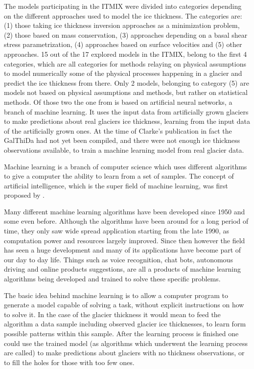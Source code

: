 The models participating in the ITMIX were divided into categories depending on the different approaches used to model the ice thickness. The categories are: (1) those taking ice thickness inversion approaches as a minimization problem, (2) those based on mass conservation,  (3) approaches depending on a basal shear stress parametrization, (4) approaches based on surface velocities and (5) other approaches. 15 out of the 17 explored models in the ITMIX, belong to the first 4 categories, which are all categories for methods relaying on physical assumptions to model numerically some of the physical processes happening in a glacier and predict the ice thickness from there. Only 2 models, belonging to category (5) are models not based on physical assumptions and methods, but rather on statistical methods. Of those two the one from \citet{Clarke2009} is based on artificial neural networks, a branch of machine learning. It uses the input data from artificially grown glaciers to make predictions about real glaciers ice thickness, learning from the input data of the artificially grown ones. At the time of Clarke's publication in fact the GalThiDa had not yet been compiled, and there were not enough ice thickness observations available, to train a machine learning model from real glacier data.

Machine learning is a branch of computer science which uses different algorithms to give a computer the ability to learn from a set of samples. The concept of artificial intelligence, which is the super field of machine learning, was first proposed by \citet{Turing1950}.

Many different machine learning algorithms have been developed since 1950 and some even before. Although the algorithms have been around for a long period of time, they only saw wide spread application starting from the late 1990, as computation power and resources largely improved. Since then however the field has seen a huge development and many of its applications have become part of our day to day life. Things such as voice recognition, chat bots, autonomous driving and online products suggestions, are all a products of machine learning algorithms being developed and trained to solve these specific problems.

The basic idea behind machine learning is to allow a computer program to generate a model capable of solving a task, without explicit instructions on how to solve it. In the case of the glacier thickness it would mean to feed the algorithm a data sample including observed glacier ice thicknesses, to learn form possible patterns within this sample. After the learning process is finished one could use the trained model (as algorithms which underwent the learning process are called) to make predictions about glaciers with no thickness observations, or to fill the holes for those with too few ones.

